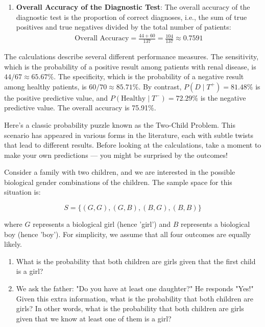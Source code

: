\begin{solution}
\begin{enumerate}[label=(\alph*)]
        \item \textbf{Overall Accuracy of the Diagnostic Test}:
        The overall accuracy of the diagnostic test is the proportion of correct diagnoses, i.e., the sum of true positives and true negatives divided by the total number of patients:
        \begin{align*}
            \text{Overall Accuracy} =\frac{44+60}{137}=\frac{104}{137} \approx 0.7591
        \end{align*}
    \end{enumerate}


The calculations describe several different performance measures. The sensitivity, which is the probability of a positive result among patients with renal disease, is \(44/67\approx65.67\%\). The specificity, which is the probability of a negative result among healthy patients, is \(60/70\approx85.71\%\). By contrast, \(P(D\mid T^+)=81.48\%\) is the positive predictive value, and \(P(\text{Healthy}\mid T^-)=72.29\%\) is the negative predictive value. The overall accuracy is 75.91\%.
\leavevmode\end{solution}

Here’s a classic probability puzzle known as the Two-Child Problem. This scenario has appeared in various forms in the literature, each with subtle twists that lead to different results. Before looking at the calculations, take a moment to make your own predictions — you might be surprised by the outcomes!

\begin{example}
    Consider a family with two children, and we are interested in the possible biological gender combinations of the children. The sample space for this situation is:

\[
S = \{(G, G), (G, B), (B, G), (B, B)\}
\]

where \( G \) represents a biological girl (hence 'girl') and \( B \) represents a biological boy (hence 'boy'). For simplicity, we assume that all four outcomes are equally likely.

\begin{enumerate}[label=(\alph*)]
    \item What is the probability that both children are girls given that the first child is a girl?
    \item We ask the father: "Do you have at least one daughter?" He responds "Yes!" Given this extra information, what is the probability that both children are girls? In other words, what is the probability that both children are girls given that we know at least one of them is a girl?
\end{enumerate}
\end{example}

